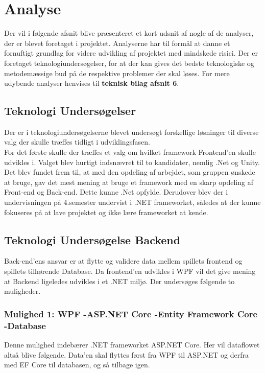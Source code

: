 \newpage
\section{Analyse}
Der vil i følgende afsnit blive præsenteret et kort udsnit af nogle af de analyser, der er blevet foretaget i projektet. Analyserne har til formål at danne et fornuftigt grundlag for videre udvikling af
projektet med mindskede risici. Der er foretaget teknologiundersøgelser, for at der kan gives det bedste teknologiske og metodemæssige bud på de respektive problemer der skal løses. For mere udybende analyser henvises til \textbf{teknisk bilag afsnit 6}.

\subsection{Teknologi Undersøgelser}
Der er i teknologiundersøgelserne blevet undersøgt forskellige løsninger til diverse valg der skulle træffes tidligt i udviklingsfasen.\\
For det første skulle der træffes et valg om hvilket framework Frontend'en skulle udvikles i. Valget blev hurtigt indsnævret til to kandidater, nemlig .Net og Unity. Det blev fundet frem til, at med den 
opdeling af arbejdet, som gruppen ønskede at bruge, gav det mest mening at bruge et framework med en skarp opdeling af Front-end og Back-end. 
Dette kunne .Net opfylde. Derudover blev der i undervisningen på 4.semester undervist i .NET frameworket, således at der kunne fokuseres på at lave projektet og ikke lære frameworket at kende. 


\subsection{Teknologi Undersøgelse Backend}
Back-end’ens ansvar er at flytte og validere data mellem spillets frontend og spillets tilhørende Database. Da frontend'en udvikles i WPF vil det give mening at Backend ligeledes udvikles i et .NET miljø.
Der undersøges følgende to muligheder.\\

\subsubsection{Mulighed 1: WPF -\g ASP.NET Core -\g Entity Framework Core -\g Database}
Denne mulighed indebærer .NET frameworket ASP.NET Core. Her vil dataflowet altså blive følgende. Data’en skal flyttes først fra WPF til ASP.NET og derfra med EF Core\cite{Entity-Framework-Core} til databasen, og så tilbage igen.

